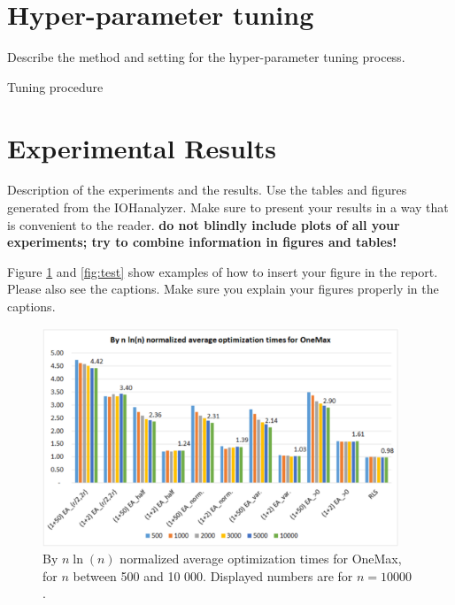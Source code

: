 \documentclass{article}
\begin{document}
\section{Hyper-parameter tuning}
Describe the method and setting for the hyper-parameter tuning process.

\begin{algorithm}[!ht]
\SetAlgoLined
{}

\BlankLine

\caption{Tuning procedure}\label{al:tuning}
\end{algorithm}

\section{Experimental Results}\label{sec:experi}

Description of the experiments and the results. Use the tables and figures generated from the IOHanalyzer. Make sure to present your results in a way that is convenient to the reader. \textbf{do not blindly include plots of all your experiments; try to combine information in figures and tables!} 

Figure \ref{fig:example} and \ref{fig:test} show examples of how to insert your figure in the report. Please also see the captions. Make sure you explain your figures properly in the captions.

\begin{figure}[!ht]
 \begin{center}    \includegraphics[width=0.95\textwidth]{example.png}
 \end{center}
 \caption{By $n\ln(n)$ normalized average optimization times for OneMax, for $n$ between 500 and 10 000. Displayed numbers are for $n = 10 000$ \cite{ye2019interpolating}.}
 \label{fig:example}
\end{figure}
\end{document}
